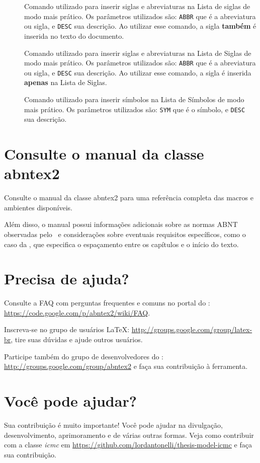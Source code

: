 \begin{description}
    \item[] Comando utilizado para inserir siglas e abreviaturas na Lista de siglas de modo mais prático. Os parâmetros utilizados são: \texttt{ABBR} que é a abreviatura ou sigla, e \texttt{DESC} sua descrição. Ao utilizar esse comando, a sigla \textbf{também} é inserida no texto do documento.
    \item[] Comando utilizado para inserir siglas e abreviaturas na Lista de Siglas de modo mais prático. Os parâmetros utilizados são: \texttt{ABBR} que é a abreviatura ou sigla, e \texttt{DESC} sua descrição. Ao utilizar esse comando, a sigla é inserida \textbf{apenas} na Lista de Siglas.
    \item[] Comando utilizado para inserir símbolos na Lista de Símbolos de modo mais prático. Os parâmetros utilizados são: \texttt{SYM} que é o símbolo, e \texttt{DESC} sua descrição. 
    
\end{description}


\section{Consulte o manual da classe \textsf{abntex2}}

Consulte o manual da classe \textsf{abntex2} \cite{abntex2classe} para uma
referência completa das macros e ambientes disponíveis. 

Além disso, o manual possui informações adicionais sobre as normas ABNT
observadas pelo \abnTeX\ e considerações sobre eventuais requisitos específicos, como o caso da , que
especifica o espaçamento entre os capítulos e o início do texto.



\section{Precisa de ajuda?}

Consulte a FAQ com perguntas frequentes e comuns no portal do \abnTeX:
\url{https://code.google.com/p/abntex2/wiki/FAQ}.

Inscreva-se no grupo de usuários \LaTeX:
\url{http://groups.google.com/group/latex-br}, tire suas dúvidas e ajude
outros usuários.

Participe também do grupo de desenvolvedores do \abnTeX:
\url{http://groups.google.com/group/abntex2} e faça sua contribuição à
ferramenta.


\section{Você pode ajudar?}

Sua contribuição é muito importante! Você pode ajudar na divulgação,
desenvolvimento, aprimoramento e de várias outras formas. Veja como contribuir com a classe \textit{icmc} em
\url{https://github.com/lordantonelli/thesis-model-icmc} e faça sua contribuição.
